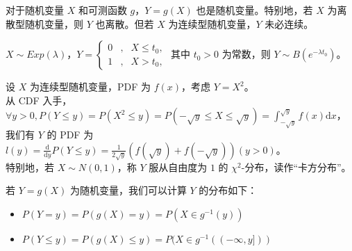 \documentclass[../main.tex]{subfiles}
\begin{document}
对于随机变量 $X$ 和可测函数 $g$，$Y=g(X)$ 也是随机变量。特别地，若 $X$ 为离散型随机变量，则 $Y$ 也离散。但若 $X$ 为连续型随机变量，$Y$ 未必连续。

\begin{example}
    $X\sim Exp(\lambda)$，$Y=\left\{
        \begin{aligned}
            0 & , & X\leq t_0, \\
            1 & , & X>t_0,
        \end{aligned}
        \right.$ 其中 $t_0>0$ 为常数，则 $Y\sim B(e^{-\lambda t_0})$。
\end{example}

\begin{example}
    设 $X$ 为连续型随机变量，PDF 为 $f(x)$，考虑 $Y=X^2$。\\
    从 CDF 入手，$\forall y>0,P(Y\leq y)=P(X^2\leq y)=P(-\sqrt{y}\leq X\leq \sqrt{y})=\int_{-\sqrt{y}}^{\sqrt{y}}f(x)\mathrm{d}x$，我们有 $Y$ 的 PDF 为 $l(y)=\frac{\mathrm{d}}{\mathrm{d}y}P(Y\leq y)=\frac{1}{2\sqrt{y}}(f(\sqrt{y})+f(-\sqrt{y}))(y>0)$。\\
    特别地，若 $X\sim N(0,1)$，称 $Y$ 服从自由度为 $1$ 的 $\chi^2$-分布，读作“卡方分布”。
\end{example}

若 $Y=g(X)$ 为随机变量，我们可以计算 $Y$ 的分布如下：
\begin{itemize}
    \item $P(Y=y)=P(g(X)=y)=P(X\in g^{-1}(y))$
    \item $P(Y\leq y)=P(g(X)\leq y)=P(X\in g^{-1}((-\infty,y]))$
\end{itemize}
\end{document}
